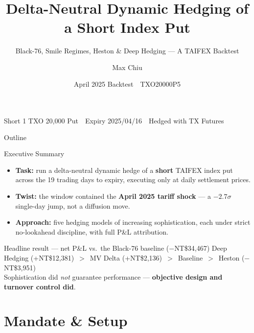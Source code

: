 \documentclass[aspectratio=169,t]{beamer}
\title[Delta-Neutral Dynamic Hedging]{Delta-Neutral Dynamic Hedging of a Short Index Put}
\subtitle{Black-76, Smile Regimes, Heston \& Deep Hedging --- A TAIFEX Backtest}
\author[Candidate]{Max Chiu}
\institute[KGI]{Quantitative Strategy Interview \,\textbar\, KGI Securities}
\date{April 2025 Backtest \,\textbar\, TXO20000P5}
\newcommand{\nt}[1]{NT\$#1}
\newcommand{\gain}[1]{\textcolor{good}{#1}}
\newcommand{\loss}[1]{\textcolor{accent}{#1}}
\begin{document}
\begin{frame}
  \titlepage
  \vfill
  \begin{center}\small
  Short 1 TXO 20{,}000 Put \,\textbar\, Expiry 2025/04/16 \,\textbar\, Hedged with TX Futures
  \end{center}
\end{frame}

\begin{frame}{Outline}
  \tableofcontents
\end{frame}

\begin{frame}{Executive Summary}
  \begin{itemize}
    \item \textbf{Task:} run a delta-neutral dynamic hedge of a \textbf{short} TAIFEX index put across the 19 trading days to expiry, executing only at daily settlement prices.
    \item \textbf{Twist:} the window contained the \textbf{April 2025 tariff shock} --- a $-2.7\sigma$ single-day jump, not a diffusion move.
    \item \textbf{Approach:} five hedging models of increasing sophistication, each under strict no-lookahead discipline, with full P\&L attribution.
  \end{itemize}
  \vspace{0.4em}
  \begin{block}{Headline result --- net P\&L vs.\ the Black-76 baseline (\loss{$-$\nt{34{,}467}})}
    \centering
    Deep Hedging \gain{(+\nt{12{,}381})} \,$>$\, MV Delta \gain{(+\nt{2{,}136})} \,$>$\, Baseline \,$>$\, Heston \loss{($-$\nt{3{,}951})}\\[0.2em]
    {\small Sophistication did \emph{not} guarantee performance --- \textbf{objective design and turnover control did}.}
  \end{block}
\end{frame}

\section{Mandate \& Setup}
\end{document}
